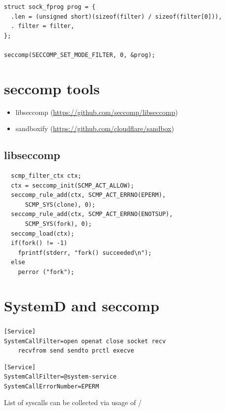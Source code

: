 \documentclass[usenames,dvipsnames]{beamer}
\newcommand{\codeinline}[1] {\texttt{\smaller[2]{#1}}}
\begin{document}
\begin{frame}[fragile]
\small
\begin{verbatim}
struct sock_fprog prog = {
  .len = (unsigned short)(sizeof(filter) / sizeof(filter[0])),
  . filter = filter,
};

seccomp(SECCOMP_SET_MODE_FILTER, 0, &prog);
\end{verbatim}
\end{frame}

\section{seccomp tools}
\begin{frame}
\begin{itemize}
  \item libseccomp (\url{https://github.com/seccomp/libseccomp})
  \item sandboxify (\url{https://github.com/cloudflare/sandbox})
\end{itemize}
\end{frame}

\subsection{libseccomp}
\begin{frame}[fragile]
\small
\begin{verbatim}
  scmp_filter_ctx ctx;
  ctx = seccomp_init(SCMP_ACT_ALLOW);
  seccomp_rule_add(ctx, SCMP_ACT_ERRNO(EPERM),
      SCMP_SYS(clone), 0);
  seccomp_rule_add(ctx, SCMP_ACT_ERRNO(ENOTSUP),
      SCMP_SYS(fork), 0);
  seccomp_load(ctx);
  if(fork() != -1)
    fprintf(stderr, "fork() succeeded\n");
  else
    perror ("fork");
\end{verbatim}
\end{frame}

\section{SystemD and seccomp}
\begin{frame}[fragile]
\frametitle{\secname}
\begin{verbatim}
[Service]
SystemCallFilter=open openat close socket recv
    recvfrom send sendto prctl execve
\end{verbatim}

\begin{verbatim}
[Service]
SystemCallFilter=@system-service
SystemCallErrorNumber=EPERM
\end{verbatim}
List of syscalls can be collected via usage of \codeinline{perf}/\codeinline{strace}
\end{frame}
\end{document}
